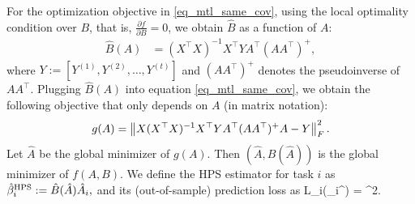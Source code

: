 	For the optimization objective  in \eqref{eq_mtl_same_cov}, using the local optimality condition over $B$, that is, $\frac{\partial f}{\partial B} = 0$, we obtain $\hat{B}$ as a function of $A$:
	\begin{align}
		\hat{B}(A) %
		&= (X^{\top} X)^{-1} X^{\top} Y A^{\top} (AA^{\top})^{+}, \label{eq_Bhat}
	\end{align}
	where $Y := [Y^{(1)}, Y^{(2)}, \dots, Y^{(t)}]$ and $(AA^{\top})^{+}$ denotes the pseudoinverse of $AA^{\top}$.
	Plugging $\hat{B}(A)$ into equation \eqref{eq_mtl_same_cov}, we obtain the following objective that only depends on $A$ (in matrix notation):
	\begin{align}\label{eq_mtl_output_layer}
		g(A) = \bignormFro{X (X^{\top}X)^{-1}X^{\top} Y A^{\top} (AA^{\top})^{+} A - Y}^2.
	\end{align}
Let $\hat A$ be the global minimizer of $g(A)$. Then $(\hat A,\hat B(\hat A))$ is the global minimizer of $f(A,B)$. We define the HPS estimator for task $i$ as $\hat \beta_i^{\textup{HPS}} := \hat B(\hat A) \hat A_i,$
and its (out-of-sample) prediction loss as
\be\label{ith_loss} L_i(\hat{\beta}_i^{\MTL}) = ^2. \ee


